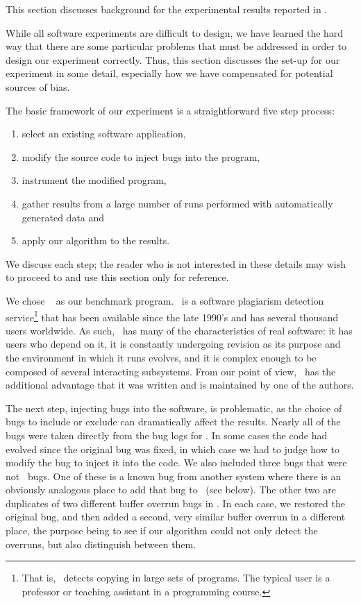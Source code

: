 This section discusses background for the experimental results
reported in .

While all software experiments are difficult to design, we have
learned the hard way that there are some particular problems that must
be addressed in order to design our experiment correctly.
Thus, this section discusses the set-up for our
experiment in some detail, especially how we have compensated for
potential sources of bias.

The basic framework of our experiment is a straightforward five step
process:
\begin{enumerate}
\item select an existing software application,
\item modify the source code to inject bugs into the program,
\item instrument the modified program,
\item gather results from a large number of runs performed with automatically generated data and
\item apply our algorithm to the results.
\end{enumerate}
We discuss each step; the reader who is not interested in
these details may wish to proceed to  and
use this section only for reference.

We chose \moss\ \cite{Schleimer:2003:WLA} as our benchmark program.  \moss\ is a
software plagiarism detection service\footnote{That is,
\moss\ detects copying in large sets of programs.  The typical \moss
user is a professor or teaching assistant in a programming course.}
that has been available since the late 1990's and has several thousand
users worldwide.  As such, \moss\ has many of the characteristics of
real software: it has users who depend on it, it is constantly
undergoing revision as its purpose and the environment in which it
runs evolves, and it is complex enough to be composed of several
interacting subsystems.  
From our point of view, \moss\ has the additional advantage that it
was written and is maintained by one of the authors.

The next step, injecting bugs into the software, is problematic, as
the choice of bugs to include or exclude can dramatically affect the
results.  Nearly all of the bugs were taken directly from the bug
logs for \moss.  In some cases the code had evolved since the original
bug was fixed, in which case we had to judge how to modify the
bug to inject it into the code.  We also included three bugs that
were not \moss\ bugs.  One of these is a known bug from another system
where there is an obviously analogous place to add that bug to \moss\
(see below). The other two are duplicates of two different buffer
overrun bugs in \moss.  In each case, we restored the original bug,
and then added a second, very similar buffer overrun in a different
place, the purpose being to see if our algorithm could not only detect
the overruns, but also distinguish between them.

